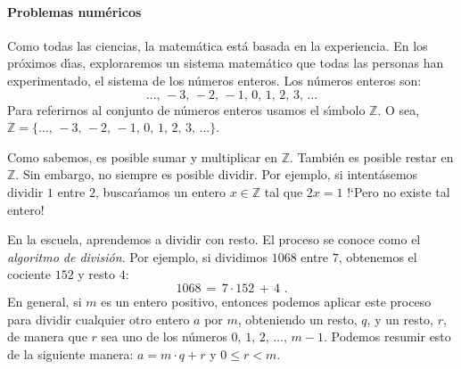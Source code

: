 \newcommand{\ZZ}{\ensuremath{\mathbb Z}}


\paragraph{Problemas num\'ericos}
Como todas las ciencias, la matem\'atica est\'a basada en la experiencia.
En los pr\'oximos d\'{\i}as, exploraremos un sistema matem\'atico que
todas las personas han experimentado, el sistema de los n\'umeros enteros.
Los n\'umeros enteros son:
\begin{displaymath}
	\dots,\,-3,\,-2,\,-1,\,0,\,1,\,2,\,3,\,\dots
\end{displaymath}
%
Para referirnos al conjunto de n\'umeros enteros usamos el s\'{\i}mbolo
$\ZZ$. O sea,
\begin{math}
	\mathbb Z=\{\dots,\,-3,\,-2,\,-1,\,0,\,1,\,2,\,3,\,\dots\}
\end{math}.

Como sabemos, es posible sumar y multiplicar en $\ZZ$.
Tambi\'en es posible restar en $\ZZ$.
Sin embargo, no siempre es posible dividir.
Por ejemplo, si intent\'asemos dividir $1$ entre $2$, buscar\'{\i}amos
un entero $x\in\ZZ$ tal que $2x=1$ !`Pero no existe tal entero!

En la escuela, aprendemos a dividir con resto. El proceso se conoce
como el \emph{algoritmo de divisi\'on}. Por ejemplo, si dividimos
$1068$ entre $7$, obtenemos el cociente $152$ y resto $4$:
\begin{displaymath}
	1068\,=\,7\cdot 152\,+\,4
	\text{ .}
\end{displaymath}
%
En general, si $m$ es un entero positivo, entonces podemos aplicar este
proceso para dividir cualquier otro entero $a$ por $m$, obteniendo un
resto, $q$, y un resto, $r$, de manera que $r$ sea uno de los n\'umeros
$0,\,1,\,2,\,\dots,\,m-1$. Podemos resumir esto de la siguiente manera:
$a=m\cdot q+r$ y $0\leq r<m$.

